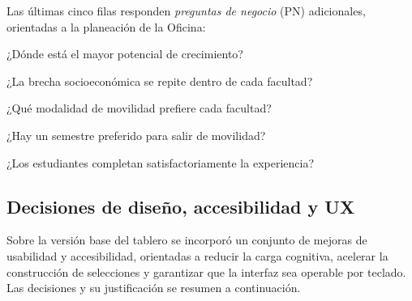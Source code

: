 \documentclass[12pt,a4paper]{article}
\begin{document}
\noindent Las últimas cinco filas responden \emph{preguntas de negocio} (PN)
adicionales, orientadas a la planeación de la Oficina:

\begin{description}[leftmargin=1.4cm,style=nextline]
    \item[PN1] ¿Dónde está el mayor potencial de crecimiento?
    \item[PN2] ¿La brecha socioeconómica se repite dentro de cada facultad?
    \item[PN3] ¿Qué modalidad de movilidad prefiere cada facultad?
    \item[PN4] ¿Hay un semestre preferido para salir de movilidad?
    \item[PN5] ¿Los estudiantes completan satisfactoriamente la experiencia?
\end{description}

\subsection{Decisiones de diseño, accesibilidad y UX}
Sobre la versión base del tablero se incorporó un conjunto de mejoras de
usabilidad y accesibilidad, orientadas a reducir la carga cognitiva, acelerar la
construcción de selecciones y garantizar que la interfaz sea operable por teclado.
Las decisiones y su justificación se resumen a continuación.
\end{document}
